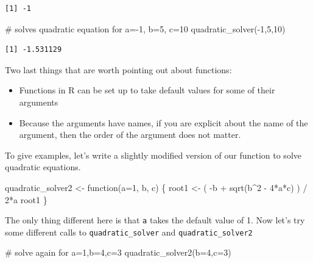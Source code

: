 \documentclass[
  letterpaper,
  DIV=11,
  numbers=noendperiod]{scrreprt}
\newenvironment{Shaded}{\begin{snugshade}}{\end{snugshade}}
\newcommand{\AttributeTok}[1]{\textcolor[rgb]{0.40,0.45,0.13}{#1}}
\newcommand{\CommentTok}[1]{\textcolor[rgb]{0.37,0.37,0.37}{#1}}
\newcommand{\ControlFlowTok}[1]{\textcolor[rgb]{0.00,0.23,0.31}{#1}}
\newcommand{\DecValTok}[1]{\textcolor[rgb]{0.68,0.00,0.00}{#1}}
\newcommand{\FunctionTok}[1]{\textcolor[rgb]{0.28,0.35,0.67}{#1}}
\newcommand{\NormalTok}[1]{\textcolor[rgb]{0.00,0.23,0.31}{#1}}
\newcommand{\OtherTok}[1]{\textcolor[rgb]{0.00,0.23,0.31}{#1}}
\newcommand{\SpecialCharTok}[1]{\textcolor[rgb]{0.37,0.37,0.37}{#1}}
\begin{document}
\begin{verbatim}
[1] -1
\end{verbatim}

\begin{Shaded}
\begin{Highlighting}[]
\CommentTok{\# solves quadratic equation for a={-}1, b=5, c=10}
\FunctionTok{quadratic\_solver}\NormalTok{(}\SpecialCharTok{{-}}\DecValTok{1}\NormalTok{,}\DecValTok{5}\NormalTok{,}\DecValTok{10}\NormalTok{)}
\end{Highlighting}
\end{Shaded}

\begin{verbatim}
[1] -1.531129
\end{verbatim}

Two last things that are worth pointing out about functions:

\begin{itemize}
\item
  Functions in R can be set up to take default values for some of their
  arguments
\item
  Because the arguments have names, if you are explicit about the name
  of the argument, then the order of the argument does not matter.
\end{itemize}

To give examples, let's write a slightly modified version of our
function to solve quadratic equations.

\begin{Shaded}
\begin{Highlighting}[]
\NormalTok{quadratic\_solver2 }\OtherTok{\textless{}{-}} \ControlFlowTok{function}\NormalTok{(}\AttributeTok{a=}\DecValTok{1}\NormalTok{, b, c) \{}
\NormalTok{  root1 }\OtherTok{\textless{}{-}}\NormalTok{ ( }\SpecialCharTok{{-}}\NormalTok{b }\SpecialCharTok{+} \FunctionTok{sqrt}\NormalTok{(b}\SpecialCharTok{\^{}}\DecValTok{2} \SpecialCharTok{{-}} \DecValTok{4}\SpecialCharTok{*}\NormalTok{a}\SpecialCharTok{*}\NormalTok{c) ) }\SpecialCharTok{/} \DecValTok{2}\SpecialCharTok{*}\NormalTok{a}
\NormalTok{  root1}
\NormalTok{\}}
\end{Highlighting}
\end{Shaded}

The only thing different here is that \texttt{a} takes the default value
of 1. Now let's try some different calls to \texttt{quadratic\_solver}
and \texttt{quadratic\_solver2}

\begin{Shaded}
\begin{Highlighting}[]
\CommentTok{\# solve again for a=1,b=4,c=3}
\FunctionTok{quadratic\_solver2}\NormalTok{(}\AttributeTok{b=}\DecValTok{4}\NormalTok{,}\AttributeTok{c=}\DecValTok{3}\NormalTok{)}
\end{Highlighting}
\end{Shaded}
\end{document}
